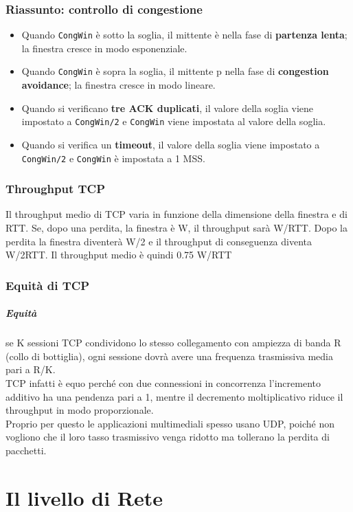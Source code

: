 \documentclass{report}
\begin{document}
	\subsection{Riassunto: controllo di congestione}
	\begin{itemize}
		\item Quando \verb|CongWin| è sotto la soglia, il mittente è nella fase di \textbf{partenza lenta}; la finestra cresce in modo esponenziale.
		\item Quando \verb|CongWin| è sopra la soglia, il mittente p nella fase di \textbf{congestion avoidance}; la finestra cresce in modo lineare.
		\item Quando si verificano \textbf{tre ACK duplicati}, il valore della soglia viene impostato a \verb|CongWin/2| e \verb|CongWin| viene impostata al valore della soglia.
		\item Quando si verifica un \textbf{timeout}, il valore della soglia viene impostato a \verb|CongWin/2| e \verb|CongWin| è impostata a 1 MSS.
	\end{itemize}
	\subsection{Throughput TCP}
	Il throughput medio di TCP varia in funzione della dimensione della finestra e di RTT. Se, dopo una perdita, la finestra è W, il throughput sarà W/RTT. Dopo la perdita la finestra diventerà W/2 e il throughput di conseguenza diventa W/2RTT. Il throughput medio è quindi 0.75 W/RTT
	\subsection{Equità di TCP}
	\paragraph{Equità} se K sessioni TCP condividono lo stesso collegamento con ampiezza di banda R (collo di bottiglia), ogni sessione dovrà avere una frequenza trasmissiva media pari a R/K.
	\medskip\\TCP infatti è equo perché con due connessioni in concorrenza l'incremento additivo ha una pendenza pari a 1, mentre il decremento moltiplicativo riduce il throughput in modo proporzionale.
	\medskip\\Proprio per questo le applicazioni multimediali spesso usano UDP, poiché non vogliono che il loro tasso trasmissivo venga ridotto ma tollerano la perdita di pacchetti.
	
	\chapter{Il livello di Rete}
	
\end{document}
